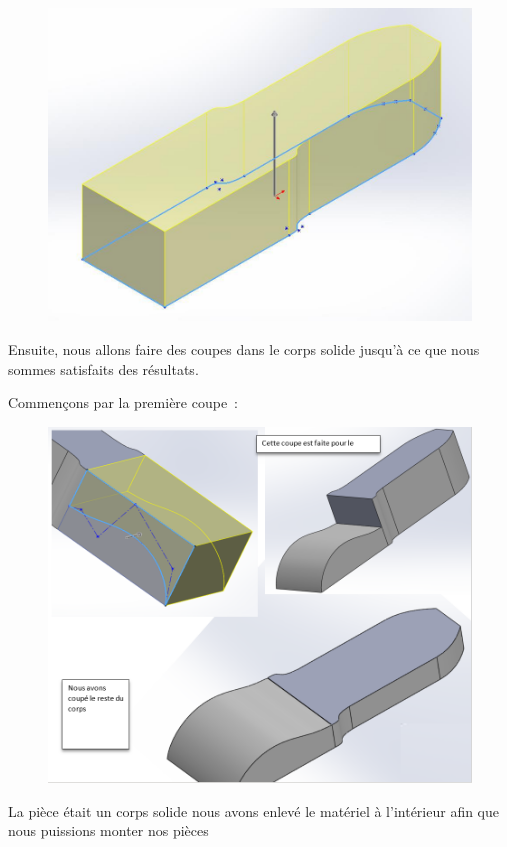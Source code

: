 \begin{figure}[!htbp]
    \centering
    \includegraphics[width=.7\linewidth]{assets/conception1/img269.jpg}
\end{figure}

\FloatBarrier

Ensuite, nous allons faire des coupes dans le corps solide jusqu’à ce que nous sommes satisfaits des résultats.

Commençons par la première coupe : 

\begin{figure}[!htbp]
    \centering
    \includegraphics[width=\linewidth]{assets/conception1/18.png}
\end{figure}

\FloatBarrier

La pièce était un corps solide nous avons enlevé le matériel à l’intérieur afin que nous puissions monter nos pièces

